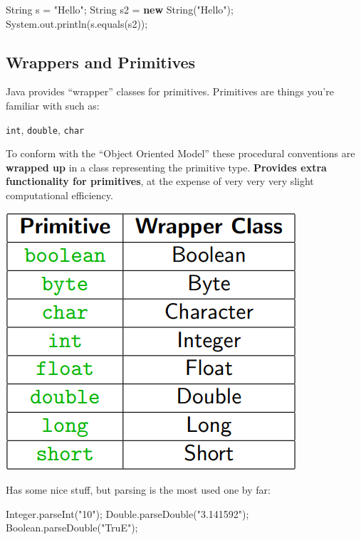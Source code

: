 \documentclass[]{article}
\newenvironment{Shaded}{}{}
\newcommand{\BuiltInTok}[1]{#1}
\newcommand{\FunctionTok}[1]{\textcolor[rgb]{0.02,0.16,0.49}{#1}}
\newcommand{\KeywordTok}[1]{\textcolor[rgb]{0.00,0.44,0.13}{\textbf{#1}}}
\newcommand{\NormalTok}[1]{#1}
\newcommand{\StringTok}[1]{\textcolor[rgb]{0.25,0.44,0.63}{#1}}
\begin{document}
\begin{Shaded}
\begin{Highlighting}[]
\BuiltInTok{String}\NormalTok{ s = }\StringTok{"Hello"}\NormalTok{;}
\BuiltInTok{String}\NormalTok{ s2 = }\KeywordTok{new} \BuiltInTok{String}\NormalTok{(}\StringTok{"Hello"}\NormalTok{);}
\BuiltInTok{System}\NormalTok{.}\FunctionTok{out}\NormalTok{.}\FunctionTok{println}\NormalTok{(s.}\FunctionTok{equals}\NormalTok{(s2));}
\end{Highlighting}
\end{Shaded}

\hypertarget{wrappers-and-primitives}{%
\subsection{Wrappers and Primitives}\label{wrappers-and-primitives}}

Java provides ``wrapper'' classes for primitives. Primitives are things
you're familiar with such as:

\texttt{int}, \texttt{double}, \texttt{char}

To conform with the ``Object Oriented Model'' these procedural
conventions are \textbf{wrapped up} in a class representing the
primitive type. \textbf{Provides extra functionality for primitives}, at
the expense of very very very slight computational efficiency.

\includegraphics{images/primitive-wrappers.png}

Has some nice stuff, but parsing is the most used one by far:

\begin{Shaded}
\begin{Highlighting}[]
\BuiltInTok{Integer}\NormalTok{.}\FunctionTok{parseInt}\NormalTok{(}\StringTok{"10"}\NormalTok{);}
\BuiltInTok{Double}\NormalTok{.}\FunctionTok{parseDouble}\NormalTok{(}\StringTok{"3.141592"}\NormalTok{);}
\BuiltInTok{Boolean}\NormalTok{.}\FunctionTok{parseDouble}\NormalTok{(}\StringTok{"TruE"}\NormalTok{);}
\end{Highlighting}
\end{Shaded}
\end{document}
